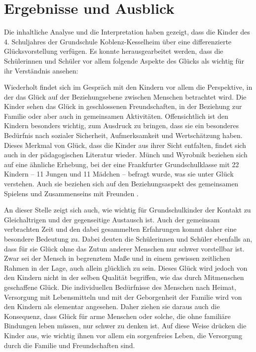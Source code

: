 \section{Ergebnisse und Ausblick}

Die inhaltliche Analyse und die Interpretation haben gezeigt, dass die Kinder des 4. Schuljahres der Grundschule Koblenz-Kesselheim über eine differenzierte Glücksvorstellung verfügen. 
Es konnte herausgearbeitet werden, dass die Schülerinnen und Schüler vor allem folgende Aspekte des Glücks als wichtig für ihr Verständnis ansehen:

Wiederholt findet sich im Gespräch mit den Kindern vor allem die Perspektive, in der das Glück auf der Beziehungsebene zwischen Menschen betrachtet wird. 
Die Kinder sehen das Glück in geschlossenen Freundschaften, in der Beziehung zur Familie oder aber auch in gemeinsamen Aktivitäten. 
Offensichtlich ist den Kindern besonders wichtig, zum Ausdruck zu bringen, dass sie ein besonderes Bedürfnis nach sozialer Sicherheit, Aufmerksamkeit und Wertschätzung haben. 
Dieses Merkmal von Glück, dass die Kinder aus ihrer Sicht entfalten, findet sich auch in der pädagogischen Literatur wieder. 
Münch und Wyrobnik beziehen sich auf eine ähnliche Erhebung, bei der eine Frankfurter Grundschulklasse mit 22 Kindern -- 11 Jungen und 11 Mädchen -- befragt wurde, was sie unter Glück verstehen. 
Auch sie beziehen sich auf den Beziehungsaspekt des gemeinsamen Spielens und Zusammenseins mit Freunden \cite[S.\,62]{JM11}.

An dieser Stelle zeigt sich auch, wie wichtig für Grundschulkinder der Kontakt zu Gleichaltrigen und der gegenseitige Austausch ist. 
Auch der gemeinsam verbrachten Zeit und den dabei gesammelten Erfahrungen kommt daher eine besondere Bedeutung zu. 
Dabei deuten die Schülerinnen und Schüler ebenfalls an, dass für sie Glück ohne das Zutun anderer Menschen nur schwer vorstellbar ist. 
Zwar sei der Mensch in begrenztem Maße und in einem gewissen zeitlichen Rahmen in der Lage, auch allein glücklich zu sein. 
Dieses Glück wird jedoch von den Kindern nicht in der selben Qualität begriffen, wie das durch Mitmenschen geschaffene Glück. 
Die individuellen Bedürfnisse des Menschen nach Heimat, Versorgung mit Lebensmitteln und mit der Geborgenheit der Familie wird von den Kindern als elementar angesehen. 
Daher ziehen sie daraus auch die Konsequenz, dass Glück für arme Menschen oder solche, die ohne familiäre Bindungen leben müssen, nur schwer zu denken ist. 
Auf diese Weise drücken die Kinder aus, wie wichtig ihnen vor allem ein sorgenfreies Leben, die Versorgung durch die Familie und Freundschaften sind. 


